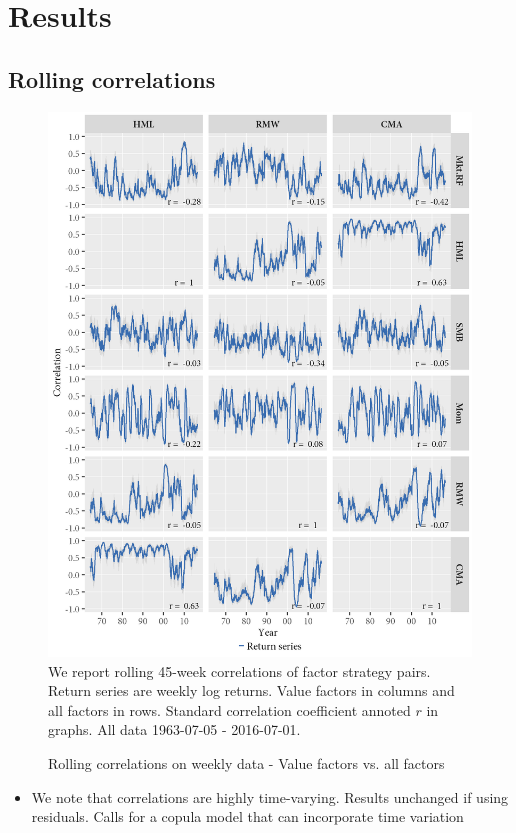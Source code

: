 \section{Results}
\subsection{Rolling correlations}
\begin{figure}[H]
  \caption{Rolling correlations on weekly data - Value factors vs. all factors}
  \label{diag:rolling45}
  \centering
  \begin{minipage}{\textwidth}
  \includegraphics[scale=1]{graphics/rolling45.png}  
  \vspace{3mm}
  \footnotesize
  We report rolling 45-week correlations of factor strategy pairs. Return series are weekly log returns. Value factors in columns and all factors in rows. Standard correlation coefficient annoted $r$ in graphs. All data 1963-07-05 - 2016-07-01.
  \end{minipage}
\end{figure}
\begin{itemize}
  \item We note that correlations are highly time-varying. Results unchanged if using residuals. Calls for a copula model that can incorporate time variation
\end{itemize}
